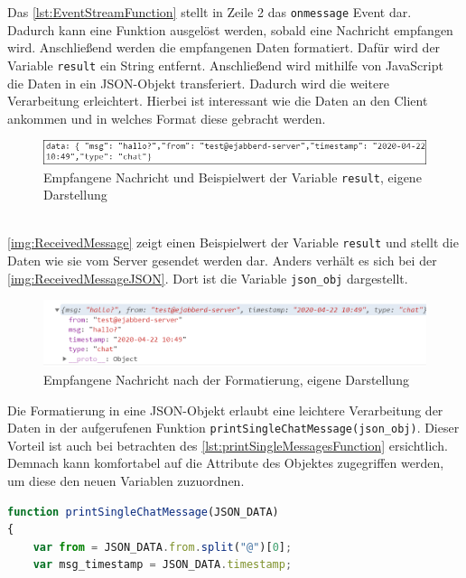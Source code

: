 \documentclass[a4paper,titlepage,halfparskip,12pt]{scrreprt}
\begin{document}
\begin{onehalfspacing}
Das \autoref{lst:EventStreamFunction} stellt in Zeile 2 das \texttt{onmessage} Event dar. Dadurch kann eine Funktion ausgelöst werden, sobald eine Nachricht empfangen wird. Anschließend werden die empfangenen Daten formatiert. Dafür wird der Variable \texttt{result} ein String entfernt. Anschließend wird mithilfe von JavaScript die Daten in ein JSON-Objekt transferiert. Dadurch wird die weitere Verarbeitung erleichtert. Hierbei ist interessant wie die Daten an den Client ankommen und in welches Format diese gebracht werden.
\begin{figure}[h]
	\centering
	\includegraphics[scale=1.2]{images/GochatAusgabeEmpfangenerNachrichtBearbeitet}
	\caption{Empfangene Nachricht und Beispielwert der Variable \texttt{result}, eigene Darstellung}
	\label{img:ReceivedMessage}
\end{figure}\\
\autoref{img:ReceivedMessage} zeigt einen Beispielwert der Variable \texttt{result} und stellt die Daten wie sie vom Server gesendet werden dar. Anders verhält es sich bei der \autoref{img:ReceivedMessageJSON}. Dort ist die Variable \texttt{json\_obj} dargestellt.
\begin{figure}[h]
	\centering
	\includegraphics[width=\textwidth]{images/GochatAusgabeEmpfangenerNachrichtJSONformat}
	\caption{Empfangene Nachricht nach der Formatierung, eigene Darstellung}
	\label{img:ReceivedMessageJSON}
\end{figure}
Die Formatierung in eine JSON-Objekt erlaubt eine leichtere Verarbeitung der Daten in der aufgerufenen Funktion \texttt{printSingleChatMessage(json\_obj)}. %
Dieser Vorteil ist auch bei betrachten des \autoref{lst:printSingleMessagesFunction} ersichtlich. Demnach kann komfortabel auf die Attribute des Objektes zugegriffen werden, um diese den neuen Variablen zuzuordnen. 
\begin{lstlisting}[language=Javascript,caption=Funktion und Datenverarbeitung des JSON-Objektes ,label={lst:printSingleMessagesFunction}]
function printSingleChatMessage(JSON_DATA)
{
	var from = JSON_DATA.from.split("@")[0];
	var msg_timestamp = JSON_DATA.timestamp;

\end{lstlisting}
\end{onehalfspacing}
\end{document}
